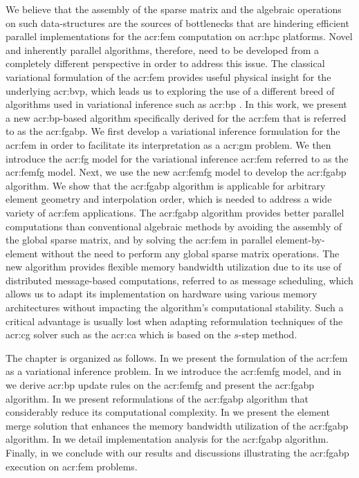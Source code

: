 We believe that the assembly of the sparse matrix and the algebraic operations on such data-structures are the sources of bottlenecks that are hindering efficient parallel implementations for the \gls{acr:fem} computation on \gls{acr:hpc} platforms.
Novel and inherently parallel algorithms, therefore, need to be developed from a completely different perspective in order to address this issue.
The classical variational formulation of the \gls{acr:fem} provides useful physical insight for the underlying \gls{acr:bvp}, which leads us to exploring the use of a different breed of algorithms used in variational inference such as \gls{acr:bp} \cite{bib:Pearl88ProbabilisticReasoning}.
In this work, we present a new \gls{acr:bp}-based algorithm specifically derived for the \gls{acr:fem} that is referred to as the \gls{acr:fgabp}.
We first develop a variational inference formulation for the \gls{acr:fem} in order to facilitate its interpretation as a \gls{acr:gm} problem.
We then introduce the \gls{acr:fg} model for the variational inference \gls{acr:fem} referred to as the \gls{acr:femfg} model.
Next, we use the new \gls{acr:femfg} model to develop the \gls{acr:fgabp} algorithm.
We show that the \gls{acr:fgabp} algorithm is applicable for arbitrary element geometry and interpolation order, which is needed to address a wide variety of \gls{acr:fem} applications.
The \gls{acr:fgabp} algorithm provides better parallel computations than conventional algebraic methods by avoiding the assembly of the global sparse matrix, and by solving the \gls{acr:fem} in parallel element-by-element without the need to perform any global sparse matrix operations.
The new algorithm provides flexible memory bandwidth utilization due to its use of distributed message-based computations, referred to as message scheduling, which allows us to adapt its implementation on hardware using various memory architectures without impacting the algorithm's computational stability.
Such a critical advantage is usually lost when adapting reformulation techniques of the \gls{acr:cg} solver such as the \gls{acr:ca} \cite[p. 34]{bib:Hoemmen2010EECS} which is based on the $s$-step \cite{bib:Chronopoulos1989153} method.




The chapter is organized as follows.
In  we present the formulation of the \gls{acr:fem} as a variational inference problem.
In  we introduce the \gls{acr:femfg} model, and in  we derive \gls{acr:bp} update rules on the \gls{acr:femfg} and present the \gls{acr:fgabp} algorithm.
In  we present reformulations of the \gls{acr:fgabp} algorithm that considerably reduce its computational complexity.
In  we present the element merge solution that enhances the memory bandwidth utilization of the \gls{acr:fgabp} algorithm.
In  we detail implementation analysis for the \gls{acr:fgabp} algorithm.
Finally, in  we conclude with our results and discussions illustrating the \gls{acr:fgabp} execution on \gls{acr:fem} problems.


